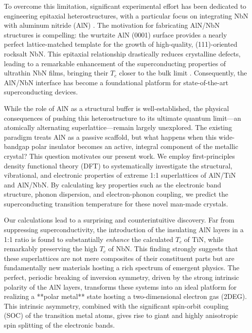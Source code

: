 \documentclass[aps,prl,reprint,superscriptaddress]{revtex4-2}
\begin{document}
To overcome this limitation, significant experimental effort has been dedicated to engineering epitaxial heterostructures, with a particular focus on integrating NbN with aluminum nitride (AlN) \cite{lita_high-quality_2017}. The motivation for fabricating AlN/NbN structures is compelling: the wurtzite AlN (0001) surface provides a nearly perfect lattice-matched template for the growth of high-quality, (111)-oriented rocksalt NbN. This epitaxial relationship drastically reduces crystalline defects, leading to a remarkable enhancement of the superconducting properties of ultrathin NbN films, bringing their $T_c$ closer to the bulk limit \cite{pernice_role_2012}. Consequently, the AlN/NbN interface has become a foundational platform for state-of-the-art superconducting devices.

While the role of AlN as a structural buffer is well-established, the physical consequences of pushing this heterostructure to its ultimate quantum limit---an atomically alternating superlattice---remain largely unexplored. The existing paradigm treats AlN as a passive scaffold, but what happens when this wide-bandgap polar insulator becomes an active, integral component of the metallic crystal? This question motivates our present work. We employ first-principles density functional theory (DFT) to systematically investigate the structural, vibrational, and electronic properties of extreme 1:1 superlattices of AlN/TiN and AlN/NbN. By calculating key properties such as the electronic band structure, phonon dispersion, and electron-phonon coupling, we predict the superconducting transition temperature for these novel man-made crystals.

Our calculations lead to a surprising and counterintuitive discovery. Far from suppressing superconductivity, the introduction of the insulating AlN layers in a 1:1 ratio is found to substantially \textit{enhance} the calculated $T_c$ of TiN, while remarkably preserving the high $T_c$ of NbN. This finding strongly suggests that these superlattices are not mere composites of their constituent parts but are fundamentally new materials hosting a rich spectrum of emergent physics. The perfect, periodic breaking of inversion symmetry, driven by the strong intrinsic polarity of the AlN layers, transforms these systems into an ideal platform for realizing a **polar metal** state hosting a two-dimensional electron gas (2DEG). This intrinsic asymmetry, combined with the significant spin-orbit coupling (SOC) of the transition metal atoms, gives rise to giant and highly anisotropic spin splitting of the electronic bands.
\end{document}
